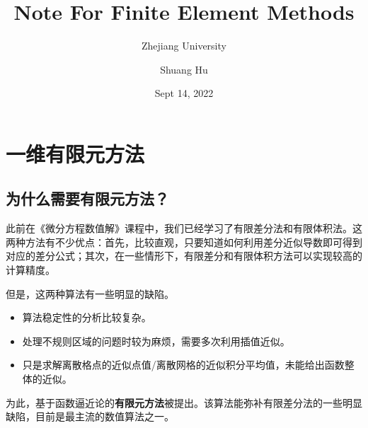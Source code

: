 \documentclass[lang=cn,10pt,newtx]{elegantbook}
\title{Note For Finite Element Methods}
\subtitle{Zhejiang University}
\author{Shuang Hu}
\institute{Zhejiang University}
\date{Sept 14, 2022}
\begin{document}
\maketitle
\frontmatter

\tableofcontents

\mainmatter

\chapter{一维有限元方法}
\section{为什么需要有限元方法？}
此前在《微分方程数值解》课程中，我们已经学习了有限差分法和有限体积法。这两种方法有不少优点：首先，比较直观，只要知道如何利用差分近似导数即可得到对应的差分公式；其次，在一些情形下，有限差分和有限体积方法可以实现较高的计算精度。

但是，这两种算法有一些明显的缺陷。
\begin{itemize}
  \item 算法稳定性的分析比较复杂。
  \item 处理不规则区域的问题时较为麻烦，需要多次利用插值近似。
  \item 只是求解离散格点的近似点值/离散网格的近似积分平均值，未能给出函数整体的近似。
\end{itemize}

为此，基于函数逼近论的\textbf{有限元方法}被提出。该算法能弥补有限差分法的一些明显缺陷，目前是最主流的数值算法之一。
\end{document}
